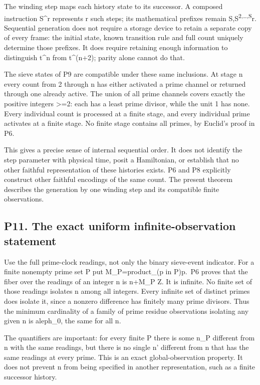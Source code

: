 \documentclass[
  11pt,
]{article}
\begin{document}
The winding step maps each history state to its successor. A composed
instruction S\^{}r represents r such steps; its mathematical prefixes
remain S,S\textsuperscript{2,\ldots,S}r. Sequential generation does not
require a storage device to retain a separate copy of every frame: the
initial state, known transition rule and full count uniquely determine
those prefixes. It does require retaining enough information to
distinguish t\^{}n from t\^{}(n+2); parity alone cannot do that.

The sieve states of P9 are compatible under these same inclusions. At
stage n every count from 2 through n has either activated a prime
channel or returned through one already active. The union of all prime
channels covers exactly the positive integers \textgreater=2: each has a
least prime divisor, while the unit 1 has none. Every individual count
is processed at a finite stage, and every individual prime activates at
a finite stage. No finite stage contains all primes, by Euclid's proof
in P6.

This gives a precise sense of internal sequential order. It does not
identify the step parameter with physical time, posit a Hamiltonian, or
establish that no other faithful representation of these histories
exists. P6 and P8 explicitly construct other faithful encodings of the
same count. The present theorem describes the generation by one winding
step and its compatible finite observations.

\subsection{P11. The exact uniform infinite-observation
statement}\label{p11.-the-exact-uniform-infinite-observation-statement}

Use the full prime-clock readings, not only the binary sieve-event
indicator. For a finite nonempty prime set P put M\_P=product\_(p in
P)p.~P6 proves that the fiber over the readings of an integer n is
n+M\_P Z. It is infinite. No finite set of those readings isolates n
among all integers. Every infinite set of distinct primes does isolate
it, since a nonzero difference has finitely many prime divisors. Thus
the minimum cardinality of a family of prime residue observations
isolating any given n is aleph\_0, the same for all n.

The quantifiers are important: for every finite P there is some n\_P
different from n with the same readings, but there is no single n'
different from n that has the same readings at every prime. This is an
exact global-observation property. It does not prevent n from being
specified in another representation, such as a finite successor history.
\end{document}
